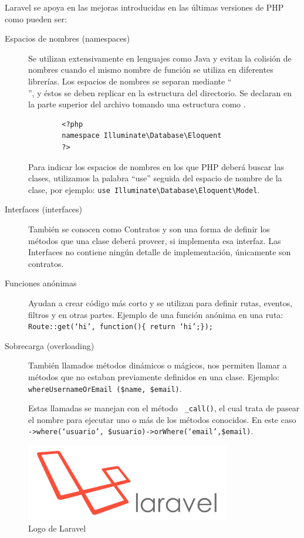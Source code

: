 Laravel se apoya en las mejoras introducidas en las últimas versiones de PHP como pueden ser:
\begin{description}
    \item[Espacios de nombres (namespaces)] Se utilizan extensivamente en lenguajes como Java y evitan la colisión de nombres cuando el mismo nombre de función se utiliza en diferentes librerías. Los espacios de nombres se separan mediante “\\”, y éstos se deben replicar en la estructura del directorio. Se declaran en la parte superior del archivo tomando una estructura como . 
    \begin{verbatim}
        <?php 
        namespace Illuminate\Database\Eloquent
        ?>
    \end{verbatim}
    Para indicar los espacios de nombres en los que PHP deberá buscar las clases, utilizamos la palabra “use” seguida del espacio de nombre de la clase, por ejemplo: \verb|use Illuminate\Database\Eloquent\Model|.
    \item[Interfaces (interfaces)]  También se conocen como Contratos y son una forma de definir los métodos que una clase deberá proveer, si implementa esa interfaz. Las Interfaces no contiene ningún detalle de implementación, únicamente son contratos.
    
    \item[Funciones anónimas] Ayudan a crear código más corto y se utilizan para definir rutas, eventos, filtros y en otras partes. Ejemplo de una función anónima en una ruta: \verb|Route::get(‘hi’, function(){ return ‘hi’;});|
    
    \item[Sobrecarga (overloading)] También llamados métodos dinámicos o mágicos, nos permiten llamar a métodos que no estaban previamente definidos en una clase. Ejemplo: \verb|whereUsernameOrEmail ($name, $email)|.  
    
    Estas llamadas se manejan con el método \verb| _call()|, el cual trata de pasear el nombre para ejecutar uno o más de los métodos conocidos. En este caso \verb|->where(‘usuario’, $usuario)->orWhere(‘email’,$email)|.


\end{description}

\begin{figure}[htb]
    \centering
    \includegraphics[width=0.8\textwidth]{imagenes/laravel-logo.png}
    \caption{Logo de Laravel}
    \label{fig:logolaravel}
\end{figure}

